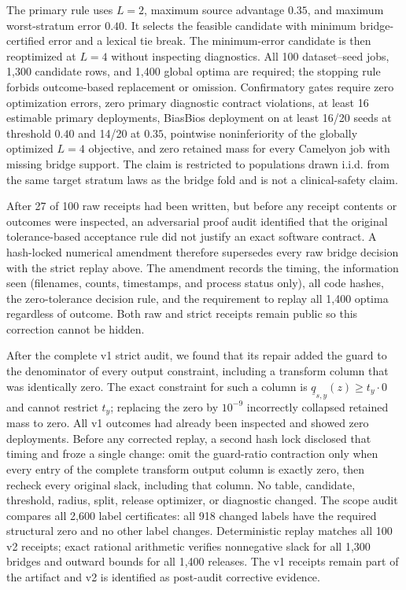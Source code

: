 The primary rule uses $L=2$, maximum source advantage $0.35$, and maximum
worst-stratum error $0.40$. It selects the feasible candidate with minimum
bridge-certified error and a lexical tie break. The minimum-error candidate is
then reoptimized at $L=4$ without inspecting diagnostics. All 100 dataset--seed
jobs, 1,300 candidate rows, and 1,400 global optima are required; the stopping
rule forbids outcome-based replacement or omission. Confirmatory gates require
zero optimization errors, zero primary diagnostic contract violations, at
least 16 estimable primary deployments, BiasBios deployment on at least 16/20
seeds at threshold $0.40$ and 14/20 at $0.35$, pointwise noninferiority of the
globally optimized $L=4$ objective, and zero retained mass for every Camelyon
job with missing bridge support. The claim is restricted to populations drawn
i.i.d. from the same target stratum laws as the bridge fold and is not a
clinical-safety claim.

After 27 of 100 raw receipts had been written, but before any receipt contents
or outcomes were inspected, an adversarial proof audit identified that the
original tolerance-based acceptance rule did not justify an exact software
contract. A hash-locked numerical amendment therefore supersedes every raw
bridge decision with the strict replay above. The amendment records the timing,
the information seen (filenames, counts, timestamps, and process status only),
all code hashes, the zero-tolerance decision rule, and the requirement to replay
all 1,400 optima regardless of outcome. Both raw and strict receipts remain
public so this correction cannot be hidden.

After the complete v1 strict audit, we found that its repair added the guard to
the denominator of every output constraint, including a transform column that
was identically zero. The exact constraint for such a column is
$\underline q_{s,y}(z)\geq t_y\cdot0$ and cannot restrict $t_y$; replacing the
zero by $10^{-9}$ incorrectly collapsed retained mass to zero. All v1 outcomes
had already been inspected and showed zero deployments. Before any corrected
replay, a second hash lock disclosed that timing and froze a single change:
omit the guard-ratio contraction only when every entry of the complete
transform output column is exactly zero, then recheck every original slack,
including that column. No table, candidate, threshold, radius, split, release
optimizer, or diagnostic changed. The scope audit compares all 2,600 label
certificates: all 918 changed labels have the required structural zero and no
other label changes. Deterministic replay matches all 100 v2 receipts; exact
rational arithmetic verifies nonnegative slack for all 1,300 bridges and
outward bounds for all 1,400 releases. The v1 receipts remain part of the
artifact and v2 is identified as post-audit corrective evidence.

